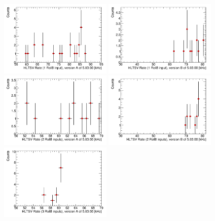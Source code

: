 \begin{figure}[!h]
  \includegraphics[width=0.49\textwidth]{figures/h_jim_roib.png}
  \includegraphics[width=0.49\textwidth]{figures/h_reinerOne.png}\\
  \includegraphics[width=0.49\textwidth]{figures/h_jimTwo.png}
  \includegraphics[width=0.49\textwidth]{figures/h_reinerTwo.png}\\
  \includegraphics[width=0.49\textwidth]{figures/h_jimThree.png}

\end{figure}
